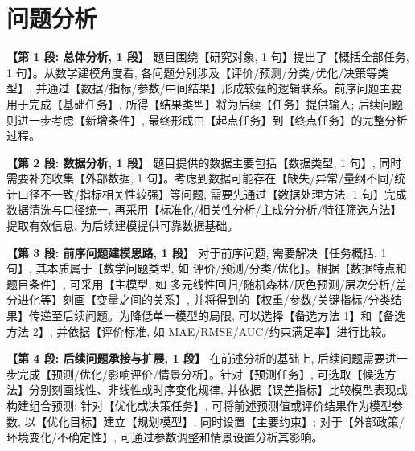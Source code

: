 
\section{问题分析}

\textbf{【第 1 段: 总体分析, 1 段】} 题目围绕【研究对象, 1 句】提出了【概括全部任务, 1 句】。从数学建模角度看, 各问题分别涉及【评价/预测/分类/优化/决策等类型】, 并通过【数据/指标/参数/中间结果】形成较强的逻辑联系。前序问题主要用于完成【基础任务】, 所得【结果类型】将为后续【任务】提供输入; 后续问题则进一步考虑【新增条件】, 最终形成由【起点任务】到【终点任务】的完整分析过程。

\textbf{【第 2 段: 数据分析, 1 段】} 题目提供的数据主要包括【数据类型, 1 句】, 同时需要补充收集【外部数据, 1 句】。考虑到数据可能存在【缺失/异常/量纲不同/统计口径不一致/指标相关性较强】等问题, 需要先通过【数据处理方法, 1 句】完成数据清洗与口径统一, 再采用【标准化/相关性分析/主成分分析/特征筛选方法】提取有效信息, 为后续建模提供可靠数据基础。

\textbf{【第 3 段: 前序问题建模思路, 1 段】} 对于前序问题, 需要解决【任务概括, 1 句】, 其本质属于【数学问题类型, 如 评价/预测/分类/优化】。根据【数据特点和题目条件】, 可采用【主模型, 如 多元线性回归/随机森林/灰色预测/层次分析/差分进化等】刻画【变量之间的关系】, 并将得到的【权重/参数/关键指标/分类结果】传递至后续问题。为降低单一模型的局限, 可以选择【备选方法 1】和【备选方法 2】, 并依据【评价标准, 如 MAE/RMSE/AUC/约束满足率】进行比较。

\textbf{【第 4 段: 后续问题承接与扩展, 1 段】} 在前述分析的基础上, 后续问题需要进一步完成【预测/优化/影响评价/情景分析】。针对【预测任务】, 可选取【候选方法】分别刻画线性、非线性或时序变化规律, 并依据【误差指标】比较模型表现或构建组合预测; 针对【优化或决策任务】, 可将前述预测值或评价结果作为模型参数, 以【优化目标】建立【规划模型】, 同时设置【主要约束】; 对于【外部政策/环境变化/不确定性】, 可通过参数调整和情景设置分析其影响。


